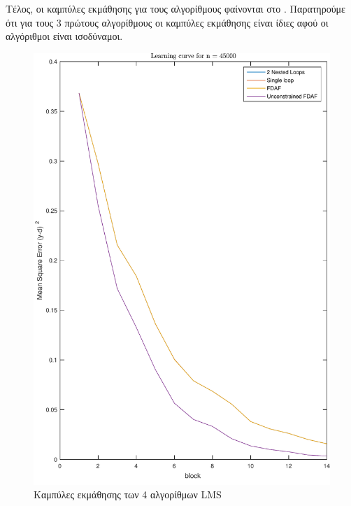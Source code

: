 Τέλος, οι καμπύλες εκμάθησης για τους αλγορίθμους φαίνονται στο .
Παρατηρούμε ότι για τους 3 πρώτους αλγορίθμους οι καμπύλες εκμάθησης είναι ίδιες αφού οι αλγόριθμοι είναι ισοδύναμοι.
\begin{figure}
\includegraphics[width=\linewidth]{plots/learning-curve}
\caption{Καμπύλες εκμάθησης των 4 αλγορίθμων LMS}
\label{fig:learning-curve}
\end{figure}
